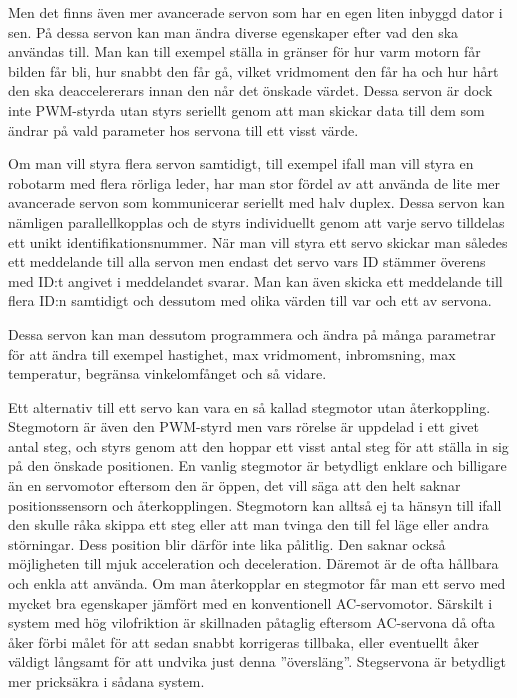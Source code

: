 \documentclass[a4paper,12pt]{article}
\begin{document}
Men det finns även mer avancerade servon som har en egen liten inbyggd dator i sen. På dessa servon kan man ändra diverse egenskaper efter vad den ska användas till. Man kan till exempel ställa in gränser för hur varm motorn får bilden får bli, hur snabbt den får gå, vilket vridmoment den får ha och hur hårt den ska deaccelererars innan den når det önskade värdet. Dessa servon är dock inte PWM-styrda utan styrs seriellt genom att man skickar data till dem som ändrar på vald parameter hos servona till ett visst värde. 
 
Om man vill styra flera servon samtidigt, till exempel ifall man vill styra en robotarm med flera rörliga leder, har man stor fördel av att använda de lite mer avancerade servon som kommunicerar seriellt med halv duplex. Dessa servon kan nämligen parallellkopplas och de styrs individuellt genom att varje servo tilldelas ett unikt identifikationsnummer. När man vill styra ett servo skickar man således ett meddelande till alla servon men endast det servo vars ID stämmer överens med ID:t angivet i meddelandet svarar. Man kan även skicka ett meddelande till flera ID:n samtidigt och dessutom med olika värden till var och ett av servona. 
 
Dessa servon kan man dessutom programmera och ändra på många parametrar för att ändra till exempel hastighet, max vridmoment, inbromsning, max temperatur, begränsa vinkelomfånget och så vidare.
 
Ett alternativ till ett servo kan vara en så kallad stegmotor utan återkoppling. Stegmotorn är även den PWM-styrd men vars rörelse är uppdelad i ett givet antal steg, och styrs genom att den hoppar ett visst antal steg för att ställa in sig på den önskade positionen. En vanlig stegmotor är betydligt enklare och billigare än en servomotor eftersom den är öppen, det vill säga att den helt saknar positionssensorn och återkopplingen. Stegmotorn kan alltså ej ta hänsyn till ifall den skulle råka skippa ett steg eller att man tvinga den till fel läge eller andra störningar. Dess position blir därför inte lika pålitlig. Den saknar också möjligheten till mjuk acceleration och deceleration. Däremot är de ofta hållbara och enkla att använda. Om man återkopplar en stegmotor får man ett servo med mycket bra egenskaper jämfört med en konventionell AC-servomotor.  Särskilt i system med hög vilofriktion är skillnaden påtaglig eftersom AC-servona då ofta åker förbi målet för att sedan snabbt korrigeras tillbaka, eller eventuellt åker väldigt långsamt för att undvika just denna ”översläng”. Stegservona är betydligt mer pricksäkra i sådana system. 
 
\end{document}
